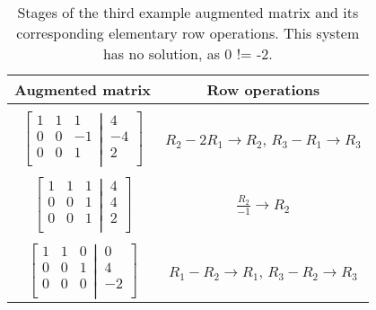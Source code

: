 \documentclass{article}
\begin{document}
    	\begin{table}[h]
    	\centering
    	\begin{tabular}{c|c}
    	
    	 Augmented matrix & Row operations
    	 \\ 
    	 \hline    	 
    	 \\
    	 $\left[
  \begin{matrix}
    1 & 1 & 1 \\  
 0 & 0 & -1  \\
 0 & 0 & 1 \\
  \end{matrix}
  \left|
    \,
    \begin{matrix}
      4  \\
      -4  \\
      2  \\
    \end{matrix}
  \right.
\right]$ & $R_{2} - 2R_{1} \rightarrow R_{2}$, $R_{3} - R_{1} \rightarrow R_{3}$

\\
\\

 $\left[
  \begin{matrix}
    1 & 1 & 1 \\  
 0 & 0 & 1  \\
 0 & 0 & 1 \\
  \end{matrix}
  \left|
    \,
    \begin{matrix}
      4  \\
      4  \\
      2  \\
    \end{matrix}
  \right.
\right]$ & $\frac{R_{2}}{-1}  \rightarrow R_{2}$

\\
\\

$\left[
  \begin{matrix}
    1 & 1 & 0 \\  
 0 & 0 & 1  \\
 0 & 0 & 0 \\
  \end{matrix}
  \left|
    \,
    \begin{matrix}
      0  \\
      4  \\
      -2 \\
    \end{matrix}
  \right.
\right]$ & $R_{1} - R_{2} \rightarrow R_{1}$, $R_{3} - R_{2} \rightarrow R_{3}$

    \end{tabular}
    \caption{Stages of the third example augmented matrix and its corresponding elementary row operations. This system has no solution, as 0 != -2.}
   \end{table}           
\end{document}
